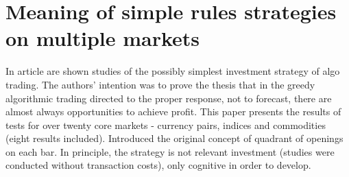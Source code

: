 \chapter{Meaning of simple rules strategies on multiple markets}
\label{chapter3SimpleRulesOtherMarkets} %

In article are shown studies of the possibly simplest investment strategy of algo trading. The authors' intention was to prove the thesis that in the greedy algorithmic trading directed to the proper response, not to forecast, there are almost always opportunities to achieve profit. This paper presents the results of tests for over twenty core markets - currency pairs, indices and commodities (eight results included). Introduced the original concept of quadrant of openings on each bar. In principle, the strategy is not relevant investment (studies were conducted without transaction costs), only cognitive in order to develop.

